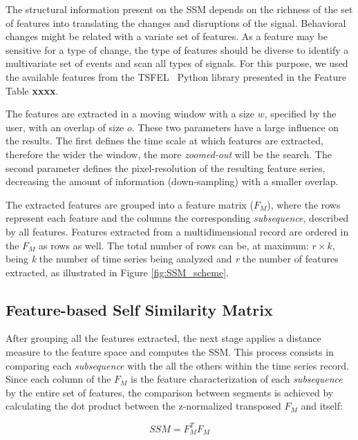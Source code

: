 The structural information present on the SSM depends on the richness of the set of features into translating the changes and disruptions of the signal. Behavioral changes might be related with a variate set of features. As a feature may be sensitive for a type of change, the type of features should be diverse to identify a multivariate set of events and scan all types of signals. For this purpose, we used the available features from the TSFEL~\cite{barandas_tsfel_2020} Python library presented in the Feature Table \textbf{xxxx}.
\par
The features are extracted in a moving window with a size $w$, specified by the user, with an overlap of size $o$. These two parameters have a large influence on the results. The first defines the time scale at which features are extracted, therefore the wider the window, the more \textit{zoomed-out} will be the search. The second parameter defines the pixel-resolution of the resulting feature series, decreasing the amount of information (down-sampling) with a smaller overlap.
\par
The extracted features are grouped into a feature matrix ($F_{M}$), where the rows represent each feature and the columns the corresponding \textit{subsequence}, described by all features. Features extracted from a multidimensional record are ordered in the $F_M$ as rows as well. The total number of rows can be, at maximum: $r \times k$, being \textit{k} the number of time series being analyzed and \textit{r} the number of features extracted, as illustrated in Figure \ref{fig:SSM_scheme}.

\subsection{Feature-based Self Similarity Matrix}
\label{sec:the_ssm}

After grouping all the features extracted, the next stage applies a distance measure to the feature space and computes the \gls{SSM}. This process consists in comparing each \textit{subsequence} with the all the others within the time series record. Since each column of the $F_M$ is the feature characterization of each \textit{subsequence} by the entire set of features, the comparison between segments is achieved by calculating the dot product between the z-normalized transposed $F_{M}$ and itself:

\begin{equation}
    SSM = F^T_M F_M
\end{equation}

